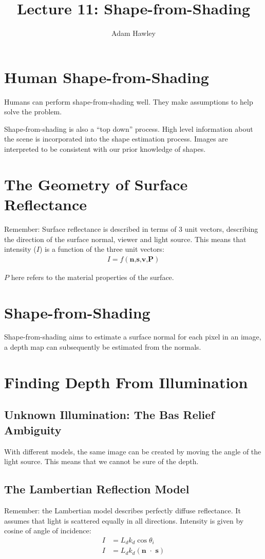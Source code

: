 \documentclass{article}
\author{Adam Hawley}
\title{Lecture 11: Shape-from-Shading}
\begin{document}
\maketitle
\tableofcontents
\newpage

\section{Human Shape-from-Shading}
Humans can perform shape-from-shading well.
They make assumptions to help solve the problem.

Shape-from-shading is also a ``top down'' process.
High level information about the scene is incorporated into the shape estimation process.
Images are interpreted to be consistent with our prior knowledge of shapes.

\section{The Geometry of Surface Reflectance}
Remember: Surface reflectance is described in terms of 3 unit vectors, describing the direction of the surface normal, viewer and light source.
This means that intensity ($I$) is a function of the three unit vectors:
\begin{align*}
	I = f(\textbf{n,s,v,P})
\end{align*}

$P$ here refers to the material properties of the surface.

\section{Shape-from-Shading}
Shape-from-shading aims to estimate a surface normal for each pixel in an image, a depth map can subsequently be estimated from the normals.

\section{Finding Depth From Illumination}

\subsection{Unknown Illumination: The Bas Relief Ambiguity}
With different models, the same image can be created by moving the angle of the light source.
This means that we cannot be sure of the depth.

\subsection{The Lambertian Reflection Model  }
Remember: the Lambertian model describes perfectly diffuse reflectance.
It assumes that light is scattered equally in all directions.
Intensity is given by cosine of angle of incidence:
\begin{align*}
	I &= L_dk_d\cos\theta_i \\
	I &= L_dk_d(\textbf{n $\cdot$ s})
\end{align*}
\end{document}
